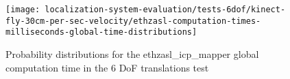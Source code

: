 \begin{figure}[H]
	\centering
	\texttt{[image: localization-system-evaluation/tests-6dof/kinect-fly-30cm-per-sec-velocity/ethzasl-computation-times-milliseconds-global-time-distributions]}
	\caption{Probability distributions for the ethzasl\_icp\_mapper global computation time in the 6 DoF translations test}
	\label{fig:localization-system-evaluation_kinect-fly-30cm-per-sec-velocity-computation-time-asl}
\end{figure}


%
%
%
%

